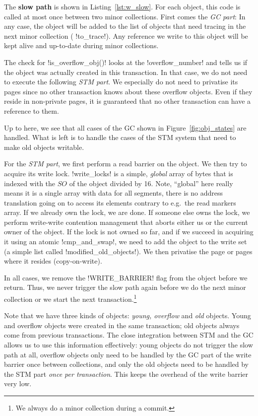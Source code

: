 \documentclass{sigplanconf}
\makeatletter
\renewcommand\lstinline[1][]{%
  \Collectverb{\@@myverb}%
}
\def\@@myverb#1{%
    \begingroup
    \fboxsep=0.2em
    \colorbox{verylightgray}{\oldlstinline|#1|}%
    \endgroup
}
\makeatother
\begin{document}
The \textbf{slow path} is shown in Listing~\ref{lst:w_slow}.  For
each object, this code is called at most once between two minor collections.
First comes the \emph{GC part}: In any case, the object will be added
to the list of objects that need tracing in the next minor collection
(\lstinline!to_trace!). Any reference we write to this object will
be kept alive and up-to-date during minor collections.

The check for \lstinline!is_overflow_obj()! looks at the
\lstinline!overflow_number!  and tells us if the object was actually
created in this transaction. In that case, we do not need to execute
the following \emph{STM part}.  We especially do not need to privatise
its pages since no other transaction knows about these overflow
objects. Even if they reside in non-private pages, it is guaranteed
that no other transaction can have a reference to them.

Up to here, we see that all cases of the GC shown in
Figure~\ref{fig:obj_states} are handled. What is left is to handle the
cases of the STM system that need to make old objects writable.

For the \emph{STM part}, we first perform a read barrier on the
object. We then try to acquire its write lock. \lstinline!write_locks!
is a simple, \emph{global} array of bytes that is indexed with the
$SO$ of the object divided by 16. Note, ``global'' here really means
it is a single array with data for all segments, there is no address
translation going on to access its elements contrary to e.g.\ the
read markers array.  If we already own the lock, we are done.
If someone else owns the lock, we perform  write-write contention
management that aborts either us or the current owner of the
object.  If the lock is not owned so far, and if we succeed in
acquiring it using an atomic
\lstinline!cmp_and_swap!, we need to add the object to the write set
(a simple list called \lstinline!modified_old_objects!).  We then
privatise the page or pages where it resides (copy-on-write).

In all cases, we remove the \lstinline!WRITE_BARRIER!  flag from the
object before we return. Thus, we never trigger the slow path again
before we do the next minor collection or we start the next
transaction.\footnote{We always do a minor collection during a commit.}

Note that we have three kinds of objects: \emph{young, overflow} and
\emph{old} objects. Young and overflow objects were created in the
same transaction; old objects always come from previous transactions.
The close integration between STM and the GC allows us to use this
information effectively: young objects do not trigger the slow path at
all, overflow objects only need to be handled by the GC part of the
write barrier once between collections, and only the old objects need
to be handled by the STM part \emph{once per transaction}. This keeps the
overhead of the write barrier very low.
\end{document}
